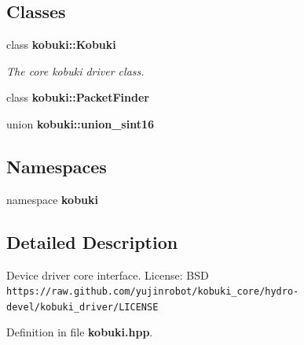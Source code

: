 \subsection*{\-Classes}
\begin{DoxyCompactItemize}
\item 
class {\bf kobuki\-::\-Kobuki}
\begin{DoxyCompactList}\small\item\em \-The core kobuki driver class. \end{DoxyCompactList}\item 
class {\bf kobuki\-::\-Packet\-Finder}
\item 
union {\bf kobuki\-::union\-\_\-sint16}
\end{DoxyCompactItemize}
\subsection*{\-Namespaces}
\begin{DoxyCompactItemize}
\item 
namespace {\bf kobuki}
\end{DoxyCompactItemize}


\subsection{\-Detailed \-Description}
\-Device driver core interface. \-License\-: \-B\-S\-D {\tt https\-://raw.\-github.\-com/yujinrobot/kobuki\-\_\-core/hydro-\/devel/kobuki\-\_\-driver/\-L\-I\-C\-E\-N\-S\-E} 

\-Definition in file {\bf kobuki.\-hpp}.

